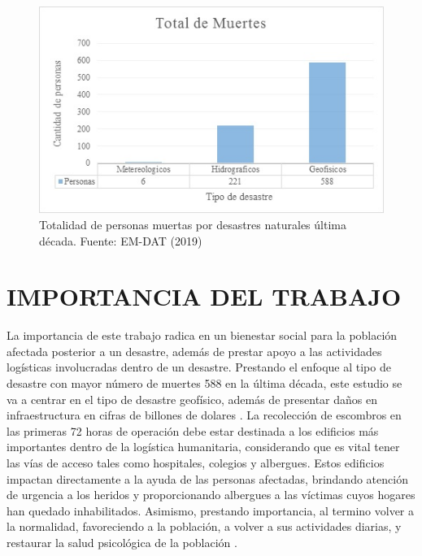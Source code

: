 \documentclass[12pt,a4paper]{article}
\begin{document}
\begin{figure}[h!]
\centering
\includegraphics[scale=0.8]{Figuras/g1.jpg}
\caption{Totalidad de personas muertas por desastres naturales última década. Fuente: EM-DAT (2019)}
\label{fig:figura1} 
\end{figure}

\section{IMPORTANCIA DEL TRABAJO}

La importancia de este trabajo radica en un bienestar social para la población afectada posterior a un desastre, además de prestar apoyo a las actividades logísticas involucradas dentro de un desastre. Prestando el enfoque al tipo de desastre con mayor número de muertes 588 en la última década, este estudio se va a centrar en el tipo de desastre geofísico, además de presentar daños en infraestructura en cifras de billones de dolares \citep{emdat}. La recolección de escombros en las primeras 72 horas de operación debe estar destinada a los edificios más importantes dentro de la logística humanitaria, considerando que es vital tener las vías de acceso  tales como hospitales, colegios y albergues. Estos edificios impactan directamente a la ayuda de las personas afectadas, brindando atención de urgencia a los heridos y proporcionando albergues a las víctimas cuyos hogares han quedado inhabilitados. Asimismo, prestando importancia, al termino volver a la normalidad, favoreciendo a la población, a volver a sus actividades diarias, y restaurar la salud psicológica de la población \citep{celik}. 


\end{document}
